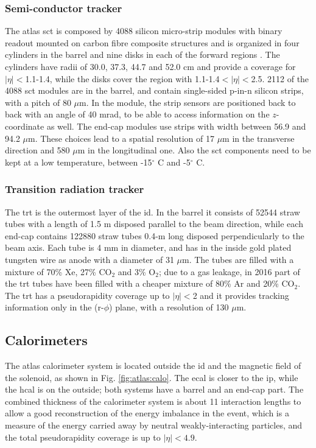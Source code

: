 \subsubsection*{Semi-conductor tracker}
The \gls{atlas} \gls{sct} is composed by 4088 silicon micro-strip modules with binary readout mounted on carbon fibre composite structures and is organized in four cylinders in the barrel and nine disks in each of the forward regions \cite{Jackson:sct}. The cylinders have  radii of 30.0, 37.3, 44.7 and 52.0 cm and provide a coverage for $|\eta|<$1.1-1.4, while the disks cover the region with 1.1-1.4$<|\eta|<$2.5. 
2112 of the 4088 \gls{sct} modules are in the barrel, and contain single-sided p-in-n silicon strips, with a pitch of 80 $\mu$m. In the module, the strip sensors are positioned back to back with an angle of 40 mrad, to be able to access information on the $z$-coordinate as well. The end-cap modules use strips with width between 56.9 and 94.2 $\mu$m. These choices lead to a spatial resolution of 17 $\mu$m in the transverse direction and 580 $\mu$m in the longitudinal one. Also the \gls{sct} components need to be kept at a low temperature, between -15$^{\circ}$ C and -5$^{\circ}$ C.

\subsubsection*{Transition radiation tracker}

The \gls{trt} is the outermost layer of the \gls{id}. In the barrel it consists of 52544 straw tubes with a length of 1.5 m disposed parallel to the beam direction, while each end-cap contains 122880 straw tubes 0.4-m long disposed perpendicularly to the beam axis. Each tube is 4 mm in diameter, and has in the inside gold plated tungsten wire as anode with a diameter of 31 $\mu$m. The tubes are filled with a mixture of 70\% Xe, 27\% CO$_2$ and 3\% O$_2$; due to a gas leakage, in 2016 part of the \gls{trt} tubes have been filled with a cheaper mixture of 80\% Ar and 20\% CO$_2$. The \gls{trt} has a pseudorapidity coverage up to $|\eta|<$2 and it provides tracking information only in the (r-$\phi$) plane, with a resolution of 130 $\mu$m.


\subsection{Calorimeters}
\label{sec:atlas:calo}

The \gls{atlas} calorimeter system is located outside the \gls{id} and the magnetic field of the solenoid, as shown in Fig. \ref{fig:atlas:calo}. The \gls{ecal} is closer to the \gls{ip}, while the \gls{hcal} is on the outside; both systems have a barrel and an end-cap part. 
The combined thickness of the calorimeter system is about 11 interaction lengths to allow a good reconstruction of the energy imbalance in the event, which is a measure of the energy carried away by neutral weakly-interacting particles, and the total pseudorapidity coverage is up to $|\eta|<4.9$. 

